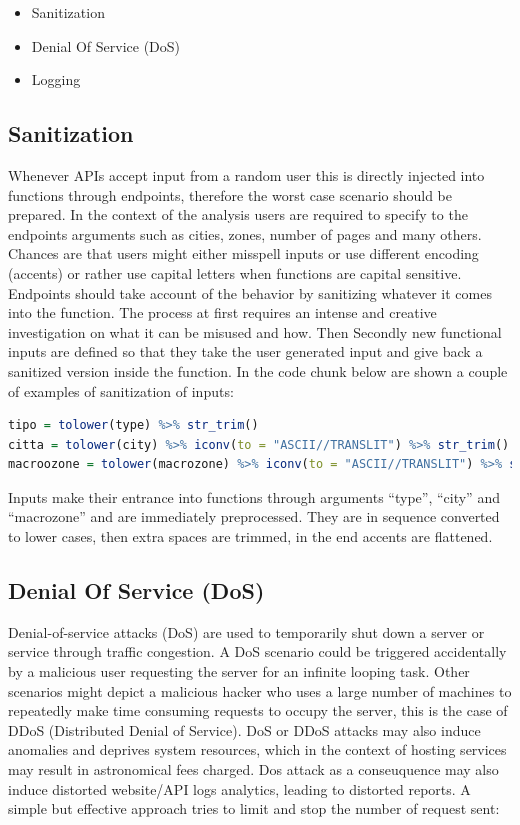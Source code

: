 \documentclass[
  12pt,
  a4paper,
  oneside]{book}
\providecommand{\tightlist}{%
  \setlength{\itemsep}{0pt}\setlength{\parskip}{0pt}}
\theoremstyle{definition}
\theoremstyle{definition}
\theoremstyle{definition}
\theoremstyle{remark}
\begin{document}
\begin{itemize}
\tightlist
\item
  Sanitization
\item
  Denial Of Service (DoS)
\item
  Logging
\end{itemize}

\hypertarget{sanitize}{%
\subsection{Sanitization}\label{sanitize}}

Whenever APIs accept input from a random user this is directly injected into functions through endpoints, therefore the worst case scenario should be prepared. In the context of the analysis users are required to specify to the endpoints arguments such as cities, zones, number of pages and many others. Chances are that users might either misspell inputs or use different encoding (accents) or rather use capital letters when functions are capital sensitive. Endpoints should take account of the behavior by sanitizing whatever it comes into the function. The process at first requires an intense and creative investigation on what it can be misused and how. Then Secondly new functional inputs are defined so that they take the user generated input and give back a sanitized version inside the function. In the code chunk below are shown a couple of examples of sanitization of inputs:

\begin{lstlisting}[language=R]
tipo = tolower(type) %>% str_trim()
citta = tolower(city) %>% iconv(to = "ASCII//TRANSLIT") %>% str_trim()
macroozone = tolower(macrozone) %>% iconv(to = "ASCII//TRANSLIT") %>% str_trim()
\end{lstlisting}

Inputs make their entrance into functions through arguments ``type'', ``city'' and ``macrozone'' and are immediately preprocessed. They are in sequence converted to lower cases, then extra spaces are trimmed, in the end accents are flattened.

\hypertarget{DoS}{%
\subsection{Denial Of Service (DoS)}\label{DoS}}

Denial-of-service attacks (DoS) are used to temporarily shut down a server or service through traffic congestion. A DoS scenario could be triggered accidentally by a malicious user requesting the server for an infinite looping task. Other scenarios might depict a malicious hacker who uses a large number of machines to repeatedly make time consuming requests to occupy the server, this is the case of DDoS (Distributed Denial of Service). DoS or DDoS attacks may also induce anomalies and deprives system resources, which in the context of hosting services may result in astronomical fees charged. Dos attack as a conseuquence may also induce distorted website/API logs analytics, leading to distorted reports.
A simple but effective approach tries to limit and stop the number of request sent:
\end{document}
